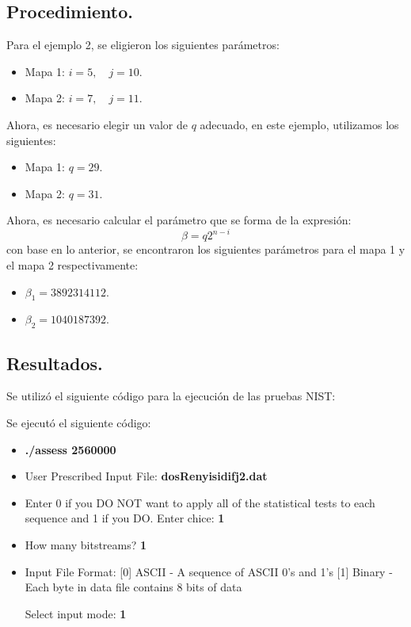 \documentclass[12pt,3p]{elsarticle}
\begin{document}
\subsection{Procedimiento.}
Para el ejemplo 2, se eligieron los siguientes parámetros:

\begin{itemize}
\item Mapa 1: $i = 5, \quad j = 10 $.


\item Mapa 2: $i = 7, \quad j = 11 $.
\end{itemize}

Ahora, es necesario elegir un valor de $q$ adecuado, en este ejemplo, utilizamos los siguientes:

\begin{itemize}
\item Mapa 1: $q = 29.$
\item Mapa 2: $q = 31.$
\end{itemize}


Ahora, es necesario calcular el parámetro que se forma de la expresión:  
\begin{equation}
\beta = q 2^{n-i}
\end{equation}
con base en lo anterior, se encontraron los siguientes parámetros para el mapa 1 y el mapa 2 respectivamente:

\begin{itemize}
\item $\beta_{1}=3892314112$.
\item $\beta_{2}=1040187392$.
\end{itemize}


\subsection{Resultados.}

Se utilizó el siguiente código para la ejecución de las pruebas NIST:

Se ejecutó el siguiente código:

\begin{itemize}
\item \textbf{./assess 2560000}
\item User Prescribed Input File: \textbf{dosRenyisidifj2.dat}
\item    Enter 0 if you DO NOT want to apply all of the
         statistical tests to each sequence and 1 if you DO. Enter chice: \textbf{1}
                  
\item  How many bitstreams? \textbf{1}

\item Input File Format:
    [0] ASCII - A sequence of ASCII 0's and 1's
    [1] Binary - Each byte in data file contains 8 bits of data

   Select input mode:  \textbf{1}
\end{itemize}
\end{document}
